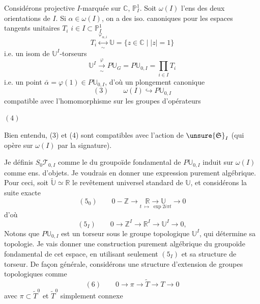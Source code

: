 Considérons   projective $I$-marquée sur $\mathbb C$, $\mathbb P^1_I$. Soit $\omega(I)$ l'ens des deux orientations de $I$. Si $\alpha\in\omega(I)$, on a des iso. canoniques  pour les espaces tangents unitaires $T_i$  $i\in I\subset\mathbb P^1_I$
\[
T_i\overset{\varphi_{\alpha,i}}{\underset{\sim}{\longleftrightarrow}}\mathbb U
=\{z\in\mathbb C\mid |z|=1\}
\]
i.e. un isom de $\mathbb U^I$-torseurs
\[
\mathbb U^I\xrightarrow[\sim]{\varphi}P\mathbb U_G=P\mathbb U_{0,I}=\prod_{i\in I}T_i
\]
i.e. un point  $\bar\alpha=\varphi(1)\in P\mathbb U_{0,I}$, d'où un plongement canonique
\[
(3)\qquad\omega(I)\hookrightarrow P\mathbb U_{0,I}
\]
compatible avec l'homomorphisme sur les groupes d'opérateurs

$(4)$\quad
{}

Bien entendu, (3) et (4) sont compatibles avec l'action de $\unsure{\mathfrak S}_I$ (qui opère sur $\omega(I)$ par la signature).

Je définis $S_0\mathcal T_{0,I}$ comme le  du groupoïde fondamental de $P\mathbb U_{0,I}$ induit  sur $\omega(I)$ comme ens. d'objets. Je voudrais en donner une expression purement algébrique. Pour ceci, soit $\widetilde{\mathbb U}\simeq\mathbb R$ le  revêtement universel standard de $\mathbb U$, et considérons la suite exacte
\[
(5_0)\qquad 0-\mathbb Z\longrightarrow
\underset{t\;\mapsto\;\exp 2i\pi t}{\mathbb R\longrightarrow\mathbb U}
\longrightarrow0
\]
d'où
\[
(5_I)\qquad0\longrightarrow\mathbb Z^I\longrightarrow\mathbb R^I\longrightarrow\mathbb U^I\longrightarrow0,
\]
 Notons que $P\mathbb U_{0,I}$ est un torseur sous le groupe topologique $\mathbb U^I$,  qui détermine sa topologie. Je vais donner une construction purement algébrique du groupoïde fondamental de cet espace, en utilisant seulement $(5_I)$ et sa structure de torseur. De façon générale, considérons une structure d'extension de groupes topologiques comme
\[
(6)\qquad0\longrightarrow\pi\longrightarrow\widetilde T\longrightarrow T\longrightarrow0
\]
avec  $\pi\subset\widetilde T^0$ et $\widetilde T^0$ simplement connexe

